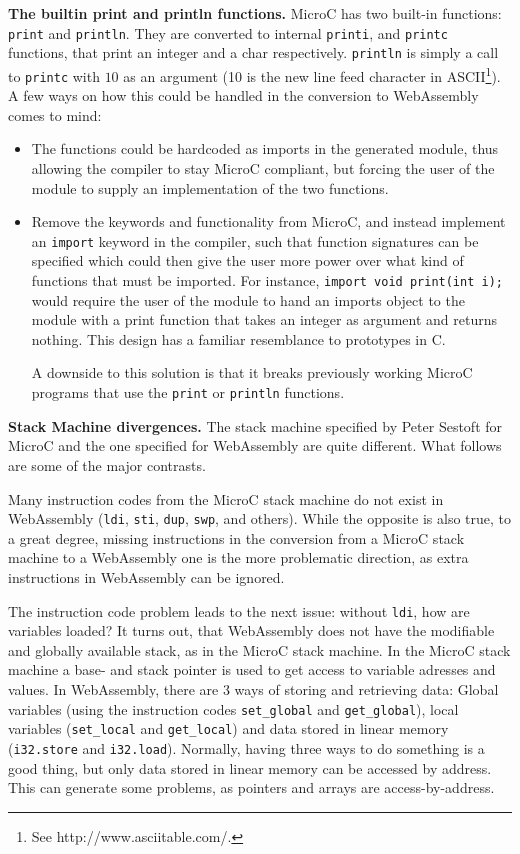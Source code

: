 \documentclass[a4paper]{article}
\begin{document}
\noindent \textbf{The builtin print and println functions.} MicroC has two built-in functions: \texttt{print} and \texttt{println}. They are converted to internal \texttt{printi}, and \texttt{printc} functions, that print an integer and a char respectively. \texttt{println} is simply a call to \texttt{printc} with $10$ as an argument (10 is the new line feed character in ASCII\footnote{See http://www.asciitable.com/.}). A few ways on how this could be handled in the conversion to WebAssembly comes to mind:
\begin{itemize}
	\item The functions could be hardcoded as imports in the generated module, thus allowing the compiler to stay MicroC compliant, but forcing the user of the module to supply an implementation of the two functions.
	\item Remove the keywords and functionality from MicroC, and instead implement an \texttt{import} keyword in the compiler, such that function signatures can be specified which could then give the user more power over what kind of functions that must be imported. For instance, \texttt{import void print(int i);} would require the user of the module to hand an imports object to the module with a print function that takes an integer as argument and returns nothing. This design has a familiar resemblance to prototypes in C.

	A downside to this solution is that it breaks previously working MicroC programs that use the \texttt{print} or \texttt{println} functions.
\end{itemize}

\noindent \textbf{Stack Machine divergences.} The stack machine specified by Peter Sestoft for MicroC and the one specified for WebAssembly are quite different. What follows are some of the major contrasts.

Many instruction codes from the MicroC stack machine do not exist in WebAssembly (\texttt{ldi}, \texttt{sti}, \texttt{dup}, \texttt{swp}, and others). While the opposite is also true, to a great degree, missing instructions in the conversion from a MicroC stack machine to a WebAssembly one is the more problematic direction, as extra instructions in WebAssembly can be ignored.

The instruction code problem leads to the next issue: without \texttt{ldi}, how are variables loaded? It turns out, that WebAssembly does not have the modifiable and globally available stack, as in the MicroC stack machine. In the MicroC stack machine a base- and stack pointer is used to get access to variable adresses and values. In WebAssembly, there are 3 ways of storing and retrieving data: Global variables (using the instruction codes \texttt{set\_global} and \texttt{get\_global}), local variables (\texttt{set\_local} and \texttt{get\_local}) and data stored in linear memory (\texttt{i32.store} and \texttt{i32.load}). Normally, having three ways to do something is a good thing, but only data stored in linear memory can be accessed by address. This can generate some problems, as pointers and arrays are access-by-address.
\end{document}
